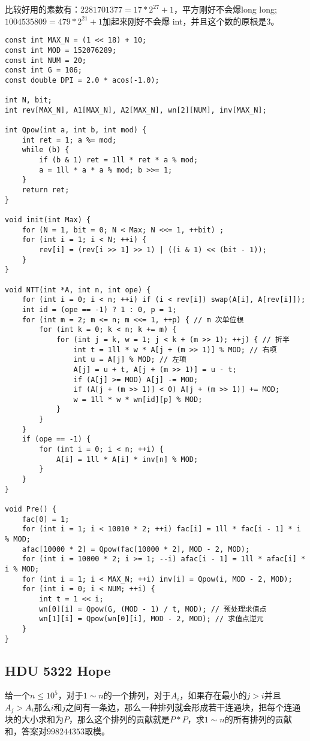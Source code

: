 比较好用的素数有：$2281701377=17*2^{27}+1$，平方刚好不会爆long long;$1004535809=479*2^{21}+1$加起来刚好不会爆 int，并且这个数的原根是$3$。
\begin{lstlisting}
const int MAX_N = (1 << 18) + 10;
const int MOD = 152076289;
const int NUM = 20;
const int G = 106;
const double DPI = 2.0 * acos(-1.0);

int N, bit;
int rev[MAX_N], A1[MAX_N], A2[MAX_N], wn[2][NUM], inv[MAX_N];

int Qpow(int a, int b, int mod) {
    int ret = 1; a %= mod;
    while (b) {
        if (b & 1) ret = 1ll * ret * a % mod;
        a = 1ll * a * a % mod; b >>= 1;
    }
    return ret;
}

void init(int Max) {
    for (N = 1, bit = 0; N < Max; N <<= 1, ++bit) ;
    for (int i = 1; i < N; ++i) {
        rev[i] = (rev[i >> 1] >> 1) | ((i & 1) << (bit - 1));
    }
}

void NTT(int *A, int n, int ope) {
    for (int i = 0; i < n; ++i) if (i < rev[i]) swap(A[i], A[rev[i]]);
    int id = (ope == -1) ? 1 : 0, p = 1;
    for (int m = 2; m <= n; m <<= 1, ++p) { // m 次单位根
        for (int k = 0; k < n; k += m) {
            for (int j = k, w = 1; j < k + (m >> 1); ++j) { // 折半
                int t = 1ll * w * A[j + (m >> 1)] % MOD; // 右项
                int u = A[j] % MOD; // 左项
                A[j] = u + t, A[j + (m >> 1)] = u - t;
                if (A[j] >= MOD) A[j] -= MOD;
                if (A[j + (m >> 1)] < 0) A[j + (m >> 1)] += MOD;
                w = 1ll * w * wn[id][p] % MOD;
            }
        }
    }
    if (ope == -1) {
        for (int i = 0; i < n; ++i) {
            A[i] = 1ll * A[i] * inv[n] % MOD;
        }
    }
}

void Pre() {
    fac[0] = 1;
    for (int i = 1; i < 10010 * 2; ++i) fac[i] = 1ll * fac[i - 1] * i % MOD;
    afac[10000 * 2] = Qpow(fac[10000 * 2], MOD - 2, MOD);
    for (int i = 10000 * 2; i >= 1; --i) afac[i - 1] = 1ll * afac[i] * i % MOD;
    for (int i = 1; i < MAX_N; ++i) inv[i] = Qpow(i, MOD - 2, MOD);
    for (int i = 0; i < NUM; ++i) {
        int t = 1 << i;
        wn[0][i] = Qpow(G, (MOD - 1) / t, MOD); // 预处理求值点
        wn[1][i] = Qpow(wn[0][i], MOD - 2, MOD); // 求值点逆元
    }
}
\end{lstlisting}
\subsection{HDU 5322 Hope}
给一个$n\leq 10^5$，对于$1\sim n$的一个排列，对于$A_i$，如果存在最小的$j > i$并且$A_j > A_i$那么$i$和$j$之间有一条边，那么一种排列就会形成若干连通块，把每个连通块的大小求和为$P$，那么这个排列的贡献就是$P*P$，求$1\sim n$的所有排列的贡献和，答案对$998244353$取模。\\

